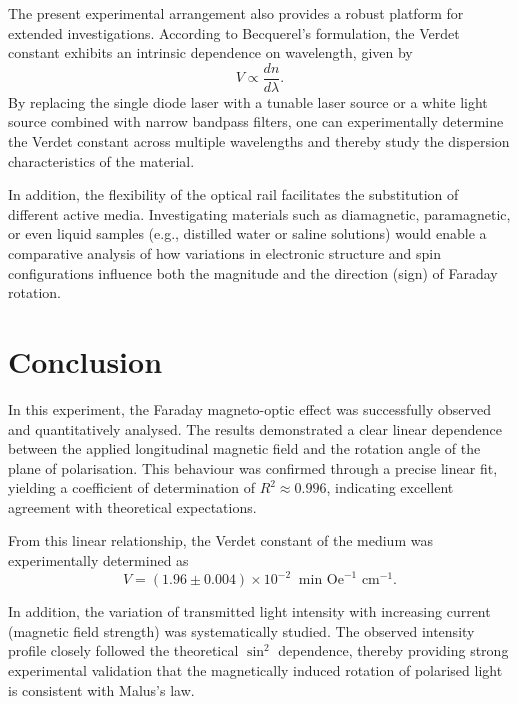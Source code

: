 The present experimental arrangement also provides a robust platform for extended investigations. According to Becquerel's formulation, the Verdet constant exhibits an intrinsic dependence on wavelength, given by
\begin{equation}
V \propto \frac{dn}{d\lambda}.
\end{equation}
By replacing the single diode laser with a tunable laser source or a white light source combined with narrow bandpass filters, one can experimentally determine the Verdet constant across multiple wavelengths and thereby study the dispersion characteristics of the material.

In addition, the flexibility of the optical rail facilitates the substitution of different active media. Investigating materials such as diamagnetic, paramagnetic, or even liquid samples (e.g., distilled water or saline solutions) would enable a comparative analysis of how variations in electronic structure and spin configurations influence both the magnitude and the direction (sign) of Faraday rotation.
\section{Conclusion}

In this experiment, the Faraday magneto-optic effect was successfully observed and quantitatively analysed. The results demonstrated a clear linear dependence between the applied longitudinal magnetic field and the rotation angle of the plane of polarisation. This behaviour was confirmed through a precise linear fit, yielding a coefficient of determination of $R^2 \approx 0.996$, indicating excellent agreement with theoretical expectations.

From this linear relationship, the Verdet constant of the medium was experimentally determined as
\begin{equation}
V = (1.96 \pm 0.004) \times 10^{-2} \ \text{ min Oe}^{-1} \text{ cm}^{-1}.
\end{equation}

In addition, the variation of transmitted light intensity with increasing current (magnetic field strength) was systematically studied. The observed intensity profile closely followed the theoretical $\sin^2$ dependence, thereby providing strong experimental validation that the magnetically induced rotation of polarised light is consistent with Malus's law.
